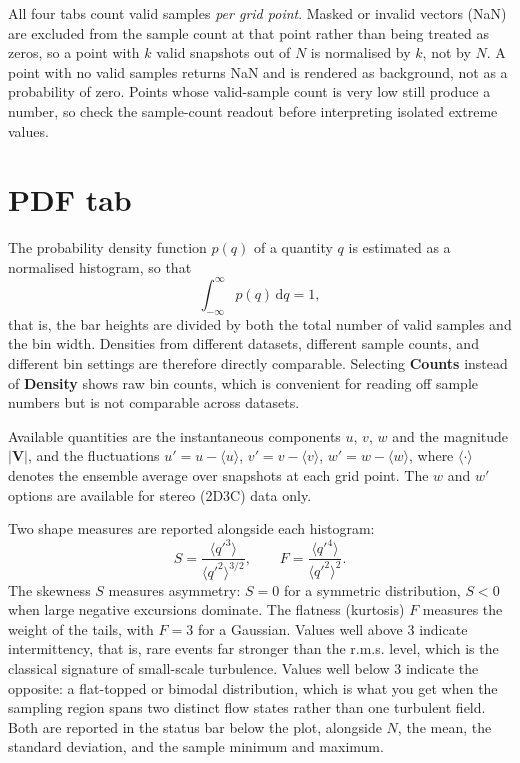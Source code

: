 \documentclass[11pt, a4paper]{report}
\newcommand{\uipth}[1]{\textbf{\textcolor{upblue}{#1}}}
\begin{document}
\begin{notebox}
All four tabs count valid samples \emph{per grid point}. Masked or invalid vectors (NaN) are excluded from the sample count at that point rather than being treated as zeros, so a point with $k$ valid snapshots out of $N$ is normalised by $k$, not by $N$. A point with no valid samples returns NaN and is rendered as background, not as a probability of zero. Points whose valid-sample count is very low still produce a number, so check the sample-count readout before interpreting isolated extreme values.
\end{notebox}

\section{PDF tab}

The probability density function $p(q)$ of a quantity $q$ is estimated as a normalised histogram, so that
\[
\int_{-\infty}^{\infty} p(q)\,\mathrm{d}q = 1 ,
\]
that is, the bar heights are divided by both the total number of valid samples and the bin width. Densities from different datasets, different sample counts, and different bin settings are therefore directly comparable. Selecting \uipth{Counts} instead of \uipth{Density} shows raw bin counts, which is convenient for reading off sample numbers but is not comparable across datasets.

Available quantities are the instantaneous components $u$, $v$, $w$ and the magnitude $|\mathbf{V}|$, and the fluctuations $u' = u - \langle u \rangle$, $v' = v - \langle v \rangle$, $w' = w - \langle w \rangle$, where $\langle \cdot \rangle$ denotes the ensemble average over snapshots at each grid point. The $w$ and $w'$ options are available for stereo (2D3C) data only.

Two shape measures are reported alongside each histogram:
\[
S = \frac{\langle q'^3 \rangle}{\langle q'^2 \rangle^{3/2}}, \qquad
F = \frac{\langle q'^4 \rangle}{\langle q'^2 \rangle^{2}} .
\]
The skewness $S$ measures asymmetry: $S = 0$ for a symmetric distribution, $S < 0$ when large negative excursions dominate. The flatness (kurtosis) $F$ measures the weight of the tails, with $F = 3$ for a Gaussian. Values well above 3 indicate intermittency, that is, rare events far stronger than the r.m.s. level, which is the classical signature of small-scale turbulence. Values well below 3 indicate the opposite: a flat-topped or bimodal distribution, which is what you get when the sampling region spans two distinct flow states rather than one turbulent field. Both are reported in the status bar below the plot, alongside $N$, the mean, the standard deviation, and the sample minimum and maximum.
\end{document}
